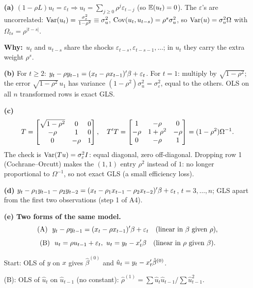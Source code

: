 \documentclass[11pt]{article}
\newcommand{\step}[1]{\par\smallskip\noindent\textbf{\textcolor{qnavy}{#1}}\quad\ignorespaces}
\newcommand{\Why}{\textbf{\textcolor{whyline}{Why:}}\ }
\begin{document}
\begin{solbox}
\step{(a)} $(1-\rho L)u_{t}=\varepsilon_{t}\Rightarrow u_{t}=\sum_{j\ge0}\rho^{j}\varepsilon_{t-j}$ (so $\mathbb{E}(u_{t})=0$). The $\varepsilon$'s are uncorrelated:
$\operatorname{Var}(u_{t})=\frac{\sigma_{\varepsilon}^{2}}{1-\rho^{2}}\equiv\sigma_{u}^{2}$, $\operatorname{Cov}(u_{t},u_{t-s})=\rho^{s}\sigma_{u}^{2}$, so
$\operatorname{Var}(u)=\sigma_{u}^{2}\Omega$ with $\Omega_{ts}=\rho^{|t-s|}$.
\begin{why}\Why $u_{t}$ and $u_{t-s}$ share the shocks $\varepsilon_{t-s},\varepsilon_{t-s-1},\dots$; in $u_{t}$ they carry the extra weight $\rho^{s}$.\end{why}
\step{(b)} For $t\ge2$: $y_{t}-\rho y_{t-1}=(x_{t}-\rho x_{t-1})^{\prime}\beta+\varepsilon_{t}$. For $t=1$: multiply by $\sqrt{1-\rho^{2}}$; the error $\sqrt{1-\rho^{2}}\,u_{1}$ has variance
$(1-\rho^{2})\sigma_{u}^{2}=\sigma_{\varepsilon}^{2}$, equal to the others. OLS on all $n$ transformed rows is exact GLS.
\step{(c)}
\[
  T=\begin{bmatrix}\sqrt{1-\rho^{2}}&0&0\\-\rho&1&0\\0&-\rho&1\end{bmatrix},\quad
  T^{\prime} T=\begin{bmatrix}1&-\rho&0\\-\rho&1+\rho^{2}&-\rho\\0&-\rho&1\end{bmatrix}=(1-\rho^{2})\Omega^{-1}.
\]
The check is $\operatorname{Var}(Tu)=\sigma_{\varepsilon}^{2}I$: equal diagonal, zero off-diagonal. Dropping row 1 (Cochrane--Orcutt) makes the $(1,1)$ entry $\rho^{2}$ instead of $1$: no longer
proportional to $\Omega^{-1}$, so not exact GLS (a small efficiency loss).
\step{(d)} $y_{t}-\rho_{1}y_{t-1}-\rho_{2}y_{t-2}=(x_{t}-\rho_{1}x_{t-1}-\rho_{2}x_{t-2})^{\prime}\beta+\varepsilon_{t}$, $t=3,\dots,n$; GLS apart from the first two observations (step 1 of A4).
\step{(e) Two forms of the same model.}
\[
  \text{(A)}\ \ y_{t}-\rho y_{t-1}=(x_{t}-\rho x_{t-1})\xT\beta+\varepsilon_{t}\quad(\text{linear in }\beta\text{ given }\rho),
\]
\[
  \text{(B)}\ \ u_{t}=\rho u_{t-1}+\varepsilon_{t},\ u_{t}=y_{t}-x_{t}^{\prime}\beta\quad(\text{linear in }\rho\text{ given }\beta).
\]
\begin{flatnum}
  \item Start: OLS of $y$ on $x$ gives $\hat\beta^{(0)}$ and $\hat u_{t}=y_{t}-x_{t}^{\prime}\hat\beta^{(0)}$.
  \item (B): OLS of $\hat u_{t}$ on $\hat u_{t-1}$ (no constant): $\hat\rho^{(1)}=\sum\hat u_{t}\hat u_{t-1}/\sum\hat u_{t-1}^{2}$.

\end{flatnum}
\end{solbox}
\end{document}
